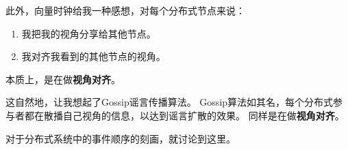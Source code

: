 \documentclass[cn,11pt,chinese]{elegantbook}
\providecommand{\tightlist}{%
  \setlength{\itemsep}{0pt}\setlength{\parskip}{0pt}}
\begin{document}
此外，向量时钟给我一种感想，对每个分布式节点来说：

\begin{enumerate}
\def\labelenumi{\arabic{enumi}.}
\tightlist
\item
  我把我的视角分享给其他节点。
\item
  我对齐我看到的其他节点的视角。
\end{enumerate}

本质上，是在做\textbf{视角对齐}。

这自然地，让我想起了Gossip谣言传播算法。
Gossip算法如其名，每个分布式参与者都在散播自己视角的信息，以达到谣言扩散的效果。
同样是在做\textbf{视角对齐}。

对于分布式系统中的事件顺序的刻画，就讨论到这里。

\backmatter
\end{document}
